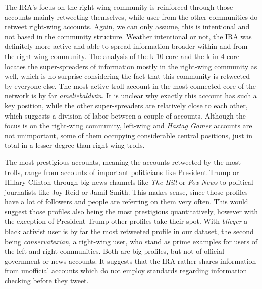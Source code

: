 \documentclass[12pt, titlepage=true, toc=bib]{scrartcl}
\begin{document}
The IRA's focus on the right-wing community is reinforced through those accounts mainly retweeting themselves, while user from the other communities do retweet right-wing accounts. Again, we can only assume, this is intentional and not based in the community structure. Weather intentional or not, the IRA was definitely more active and able to spread information broader within and from the right-wing community. The analysis of the k-10-core and the k-in-4-core locates the super-spreaders of information mostly in the right-wing community as well, which is no surprise considering the fact that this community is retweeted by everyone else. The most active troll account in the most connected core of the network is by far \textit{ameliebaldwin}. It is unclear why exactly this account has such a key position, while the other super-spreaders are relatively close to each other, which suggests a division of labor between a couple of accounts. Although the focus is on the right-wing community, left-wing and \textit{Hastag Gamer} accounts are not unimportant, some of them occupying considerable central positions, just in total in a lesser degree than right-wing trolls.

The most prestigious accounts, meaning the accounts retweeted by the most trolls, range from accounts of important politicians like President Trump or Hillary Clinton through big news channels like \textit{The Hill} or \textit{Fox News} to political journalists like Joy Reid or Jamil Smith. This makes sense, since those profiles have a lot of followers and people are referring on them very often. This would suggest those profiles also being the most prestigious quantitatively, however with the exception of President Trump other profiles take their spot. With \textit{blicqer} a black activist user is by far the most retweeted profile in our dataset, the second being \textit{conservatexian}, a right-wing user, who stand as prime examples for users of the left and right communities. Both are big profiles, but not of official government or news accounts. It suggests that the IRA rather shares information from unofficial accounts which do not employ standards regarding information checking before they tweet.
\end{document}
